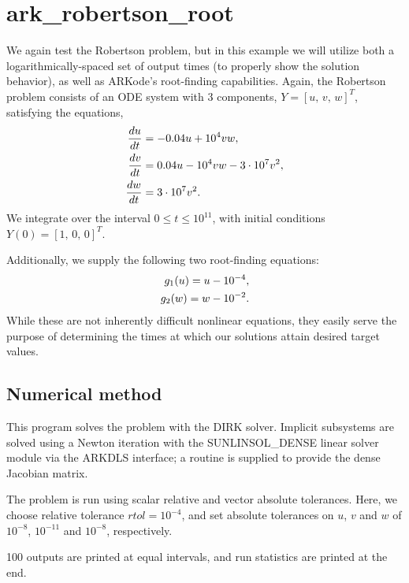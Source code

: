 \documentclass[letterpaper,10pt,english]{sphinxmanual}
\begin{document}
\section{ark\_robertson\_root}
\label{c_serial:ark-robertson-root}\label{c_serial:id13}
We again test the Robertson problem, but in this example we will
utilize both a logarithmically-spaced set of output times (to properly
show the solution behavior), as well as ARKode's root-finding
capabilities.  Again, the Robertson problem consists of an ODE system
with 3 components, \(Y = [u,\, v,\, w]^T\), satisfying the equations,
\begin{gather}
\begin{split}\frac{du}{dt} &= -0.04 u + 10^4 v w, \\
\frac{dv}{dt} &= 0.04 u - 10^4 v w - 3\cdot10^7 v^2, \\
\frac{dw}{dt} &= 3\cdot10^7 v^2.\end{split}\notag
\end{gather}
We integrate over the interval \(0\le t\le 10^{11}\), with initial
conditions  \(Y(0) = [1,\, 0,\, 0]^T\).

Additionally, we supply the following two root-finding equations:
\begin{gather}
\begin{split}g_1(u) = u - 10^{-4}, \\
g_2(w) = w - 10^{-2}.\end{split}\notag
\end{gather}
While these are not inherently difficult nonlinear equations, they
easily serve the purpose of determining the times at which our
solutions attain desired target values.


\subsection{Numerical method}
\label{c_serial:id14}
This program solves the problem with the DIRK solver.  Implicit
subsystems are solved using a Newton iteration with the
SUNLINSOL\_DENSE linear solver module via the ARKDLS interface; a
routine is supplied to provide the dense Jacobian matrix.

The problem is run using scalar relative and vector absolute
tolerances.  Here, we choose relative tolerance \(rtol=10^{-4}\),
and set absolute tolerances on \(u\), \(v\) and \(w\) of
\(10^{-8}\), \(10^{-11}\) and \(10^{-8}\), respectively.

100 outputs are printed at equal intervals, and run statistics are
printed at the end.
\end{document}
